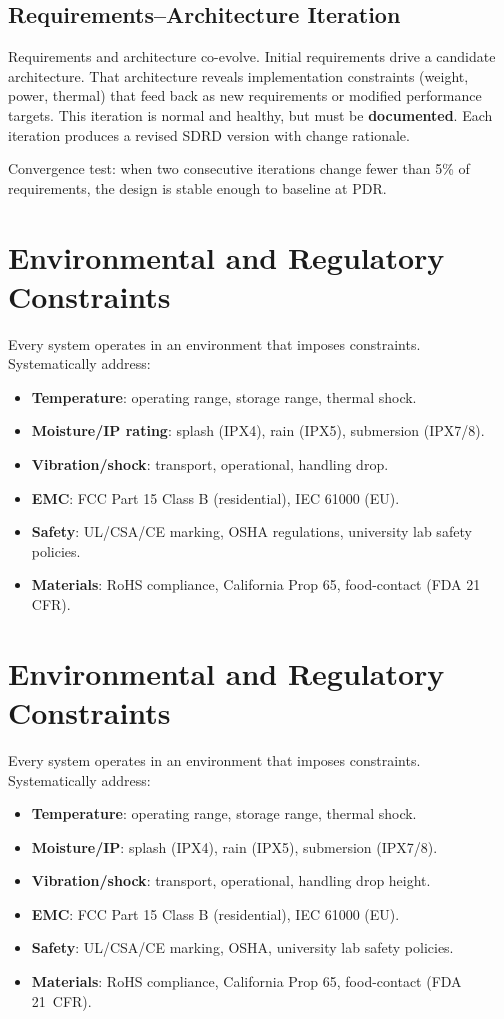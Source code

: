 \documentclass[11pt,letterpaper,twoside,openany]{book}
\begin{document}
\subsection{Requirements--Architecture Iteration}
Requirements and architecture co-evolve. Initial requirements drive a candidate architecture. That architecture reveals implementation constraints (weight, power, thermal) that feed back as new requirements or modified performance targets. This iteration is normal and healthy, but must be \textbf{documented}. Each iteration produces a revised SDRD version with change rationale.

Convergence test: when two consecutive iterations change fewer than 5\% of requirements, the design is stable enough to baseline at PDR.

\section{Environmental and Regulatory Constraints}
Every system operates in an environment that imposes constraints. Systematically address:
\begin{itemize}[nosep,leftmargin=1.5em]
\item \textbf{Temperature}: operating range, storage range, thermal shock.
\item \textbf{Moisture/IP rating}: splash (IPX4), rain (IPX5), submersion (IPX7/8).
\item \textbf{Vibration/shock}: transport, operational, handling drop.
\item \textbf{EMC}: FCC Part 15 Class B (residential), IEC 61000 (EU).
\item \textbf{Safety}: UL/CSA/CE marking, OSHA regulations, university lab safety policies.
\item \textbf{Materials}: RoHS compliance, California Prop 65, food-contact (FDA 21 CFR).
\end{itemize}


\section{Environmental and Regulatory Constraints}
Every system operates in an environment that imposes constraints. Systematically address:
\begin{itemize}[nosep,leftmargin=1.5em]
\item \textbf{Temperature}: operating range, storage range, thermal shock.
\item \textbf{Moisture/IP}: splash (IPX4), rain (IPX5), submersion (IPX7/8).
\item \textbf{Vibration/shock}: transport, operational, handling drop height.
\item \textbf{EMC}: FCC Part 15 Class B (residential), IEC 61000 (EU).
\item \textbf{Safety}: UL/CSA/CE marking, OSHA, university lab safety policies.
\item \textbf{Materials}: RoHS compliance, California Prop 65, food-contact (FDA 21~CFR).
\end{itemize}
\end{document}
